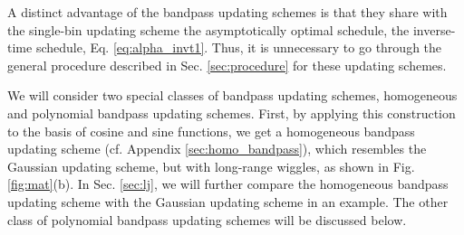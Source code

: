 \documentclass[reprint, superscriptaddress, floatfix]{revtex4-1}
\newcommand{\note}[1]{{\color{DarkGreen}\footnotesize \textsc{Note.} #1}}
\begin{document}
A distinct advantage of the bandpass updating schemes
is that they share with the single-bin updating scheme
the asymptotically optimal schedule,
the inverse-time schedule, Eq. \eqref{eq:alpha_invt1}.
%
Thus, it is unnecessary to go through the general procedure
described in Sec. \ref{sec:procedure}
for these updating schemes.

We will consider two special classes of bandpass updating schemes,
homogeneous and polynomial bandpass updating schemes.
%
%
First,
by applying this construction to the basis of cosine and sine functions,
we get a homogeneous bandpass updating scheme
(cf. Appendix \ref{sec:homo_bandpass}),
which resembles the Gaussian updating scheme,
but with long-range wiggles,
as shown in Fig. \ref{fig:mat}(b).
%
In Sec. \ref{sec:lj},
we will further compare
the homogeneous bandpass updating scheme
with the Gaussian updating scheme
in an example.
%
%
%
The other class of polynomial bandpass updating schemes will be discussed below.

\end{document}
